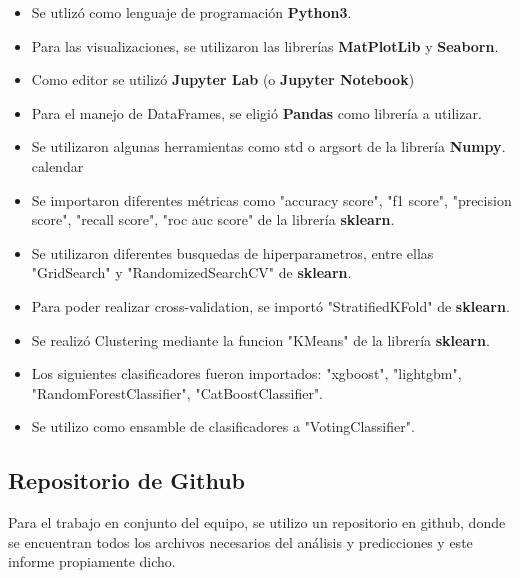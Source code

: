 \documentclass[a4paper ,12pt]{article}
\begin{document}
\begin{itemize}
	
	\item Se utlizó como lenguaje de programación \textbf{Python3}.
	
	\item Para las visualizaciones, se utilizaron las librerías \textbf{ MatPlotLib }y\textbf{ Seaborn}.
	
	\item Como editor se utilizó \textbf{Jupyter Lab} (o \textbf{Jupyter Notebook})
	
	\item Para el manejo de DataFrames, se eligió \textbf{Pandas} como librería a utilizar.

	\item Se utilizaron algunas herramientas como std o argsort de la librería \textbf{Numpy}.
	calendar
	
	\item Se importaron diferentes métricas como "accuracy score", "f1 score", "precision score", "recall score", "roc auc score" de la librería \textbf{sklearn}.
	
	\item Se utilizaron diferentes busquedas de hiperparametros, entre ellas  "GridSearch" y "RandomizedSearchCV"  de \textbf{sklearn}.
	
	\item Para poder realizar cross-validation, se importó "StratifiedKFold" de \textbf{sklearn}.

	\item Se realizó Clustering mediante la funcion "KMeans" de la librería \textbf{sklearn}.
	
	\item Los siguientes clasificadores fueron importados: 	"xgboost", "lightgbm", "RandomForestClassifier", "CatBoostClassifier".
	
	\item Se utilizo como ensamble de clasificadores a "VotingClassifier".
	
\end{itemize}

\subsection{Repositorio de Github}

Para el trabajo en conjunto del equipo, se utilizo un repositorio en github, donde se encuentran todos los archivos necesarios del análisis y predicciones y este informe propiamente dicho.\\
\end{document}
